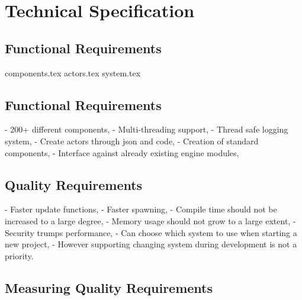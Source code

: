 \documentclass{article}
\begin{document}

\section*{Technical Specification}
\subsection*{Functional Requirements}
{components.tex}
{actors.tex}
{system.tex}

\subsection*{Functional Requirements}
- 200+ different components,
- Multi-threading support,
- Thread safe logging system,
- Create actors through json and code,
- Creation of standard components,
- Interface against already existing engine modules,

\subsection*{Quality Requirements}
- Faster update functions,
- Faster spawning,
- Compile time should not be increased to a large degree,
- Memory usage should not grow to a large extent,
- Security trumps performance, 
- Can choose which system to use when starting a new project,
    - However supporting changing system during development is not a priority.

\subsection*{Measuring Quality Requirements}
\end{document}
